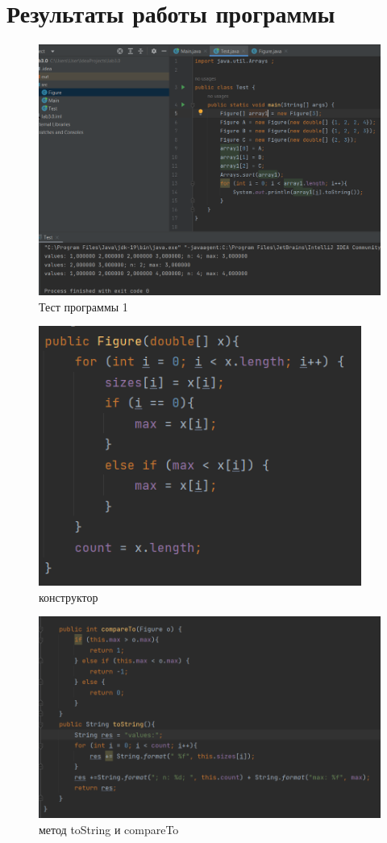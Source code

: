\documentclass[a4paper, 12pt]{extarticle}
\begin{document}
\section{Результаты работы программы}
\begin{figure}[H]
    \centering
    \includegraphics[width=\linewidth]{Test.png}
    \caption{Тест программы 1}
    \label{fig:my_label}
\end{figure}

\begin{figure}[H]
    \centering
    \includegraphics[width=300pt]{Test1.png}
    \caption{конструктор}
    \label{fig:my_label}
\end{figure}

\begin{figure}[H]
    \centering
    \includegraphics[width=\linewidth]{Test2.png}
    \caption{метод toString и compareTo}
    \label{fig:my_label}
\end{figure}
\end{document}
